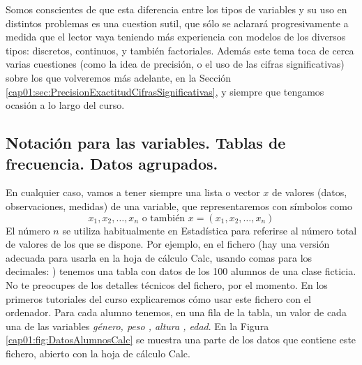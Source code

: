 Somos conscientes de que esta diferencia entre los tipos de variables y su uso en distintos problemas es una cuestion sutil, que
sólo se aclarará progresivamente a medida que el lector vaya  teniendo más experiencia con modelos de los diversos tipos: discretos,
continuos, y también factoriales. Además este tema toca de cerca varias cuestiones (como la idea de precisión, o el uso de las cifras significativas)
sobre los que volveremos más adelante, en la Sección \ref{cap01:sec:PrecisionExactitudCifrasSignificativas}, y siempre que tengamos ocasión a lo largo del curso.


\subsection{Notación para las variables. Tablas de frecuencia. Datos agrupados.}
\label{cap01:subsec:NotacionVariablesTablasFrecuenciaDatosAgrupados}

En cualquier caso, vamos a tener siempre una lista o {\sf vector} $x$ de valores
(datos, observaciones, medidas) de una variable, que representaremos con símbolos como
    \[x_1,x_2,\ldots,x_n\mbox{ o también }x=(x_1,x_2,\ldots,x_n)\]
    El {\sf número $n$} se utiliza habitualmente en Estadística para referirse
al {\sf número total de valores} de los que se dispone.
Por ejemplo, en el fichero
(hay una versión adecuada para usarla en la hoja de cálculo Calc, usando comas para los decimales:
) tenemos una tabla con datos de  los 100 alumnos de una clase ficticia. No te preocupes de los detalles técnicos del fichero, por el momento. En los primeros  tutoriales del curso explicaremos  cómo
usar este fichero con el ordenador. Para cada alumno tenemos, en una fila de la tabla, un valor de cada una de las variables {\em género, peso , altura ,
edad}.  En la Figura \ref{cap01:fig:DatosAlumnosCalc} se muestra una parte de los datos que contiene este fichero, abierto con la hoja de cálculo Calc.

